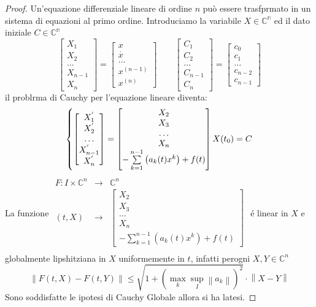\begin{proof}
	Un'equazione differenziale lineare di ordine $n$ può essere trasfprmato in un sistema di equazioni al primo ordine.
	Introduciamo la variabile $X\in\mathbb{C^n}$ ed il dato iniziale $C\in\mathbb{C^n}$
	$$\left[\begin{matrix} X_1\\X_2\\\ldots\\X_{n-1}\\X_n \end{matrix}\right] = \left[\begin{matrix} x\\\overset{\cdot}{x}\\\ldots\\ x^{(n-1)}\\x^{(n)} \end{matrix}\right]\quad\quad\left[\begin{matrix} C_1\\C_2\\\ldots\\C_{n-1}\\C_{n} \end{matrix}\right] = \left[\begin{matrix} c_0\\c_1\\\ldots\\ c_{n-2}\\c_{n-1} \end{matrix}\right]$$
	il problrma di Cauchy per l'equazione lineare diventa:
	$$
	\left\{
	\left[\begin{matrix} X_1^{'}\\X_2^{'}\\\ldots\\X_{n-1}^{'}\\X_n^{'} \end{matrix}\right]
	=
	\left[\begin{matrix} X_2\\X_3\\\ldots\\X_{n}\\-\sum\limits_{k=1}^{n-1}\left(a_k(t)x^k\right)+f(t) \end{matrix}\right]
	\\
	X(t_0)=C
	\right.
	$$
	La funzione
	$\begin{array}{rcl} 
	F: I\times\mathbb{C}^n & \to & \mathbb{C}^n \\
	   (t,X) & \to & \left[\begin{matrix} X_2\\X_3\\\ldots\\X_{n}\\-\sum\limits_{k=1}^{n-1}\left(a_k(t)x^k\right)+f(t) \end{matrix}\right] \\ 
	\end{array}$
	\'e linear in $X$ e globalmente lipshitziana in $X$ uniformemente in $t$, infatti perogni $X,Y\in\mathbb{C}^n$
	$$\left\|F(t,X)-F(t,Y)\right\|\le \sqrt{1+\left( \max\limits_k \sup\limits_I \left\|a_k\right\| \right)^2}\cdot\left\|X-Y\right\|$$
	Sono soddisfatte le ipotesi di Cauchy Globale allora si ha latesi.
\end{proof}
